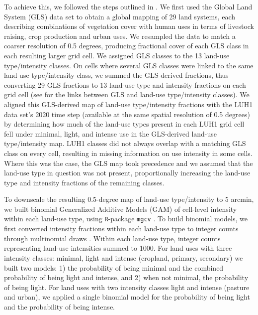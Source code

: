 \documentclass[titlesmallcaps,copyrightpage]{uomthesis}\usepackage[]{graphicx}\usepackage[]{color}
\begin{document}
To achieve this, we followed the steps outlined in \citet{newbold_global_2015}. We first used the Global Land System (GLS) data set \citep{van_asselen_land_2012} to obtain a global mapping of 29 land systems, each describing combinations of vegetation cover with human uses in terms of livestock raising, crop production and urban uses. We resampled the data to match a coarser resolution of 0.5 degrees, producing fractional cover of each GLS class in each resulting larger grid cell. We assigned GLS classes to the 13 land-use type/intensity classes. On cells where several GLS classes were linked to the same land-use type/intensity class, we summed the GLS-derived fractions, thus converting 29 GLS fractions to 13 land-use type and intensity fractions on each grid cell (see  for the links between GLS and land-use type/intensity classes). We aligned this GLS-derived map of land-use type/intensity fractions with the LUH1 data set's 2020 time step (available at the same spatial resolution of 0.5 degrees) by determining how much of the land-use types present in each LUH1 grid cell fell under minimal, light, and intense use in the GLS-derived land-use type/intensity map. LUH1 classes did not always overlap with a matching GLS class on every cell, resulting in missing information on use intensity in some cells. Where this was the case, the GLS map took precedence and we assumed that the land-use type in question was not present, proportionally increasing the land-use type and intensity fractions of the remaining classes.

To downscale the resulting 0.5-degree map of land-use type/intensity to 5 arcmin, we built binomial Generalized Additive Models (GAM) of cell-level intensity within each land-use type, using \texttt{R}-package \texttt{mgcv} \citep{r_development_core_team_r_2008, wood_fast_2011}. To build binomial models, we first converted intensity fractions within each land-use type to integer counts through multinomial draws \citep[see ,][]{kapitza_predictive_2020}. Within each land-use type, integer counts representing land-use intensities summed to 1000. For land uses with three intensity classes: minimal, light and intense (cropland, primary, secondary) we built two models: 1) the probability of being minimal and the combined probability of being light and intense, and 2) when not minimal, the probability of being light. For land uses with two intensity classes light and intense (pasture and urban), we applied a single binomial model for the probability of being light and the probability of being intense.
\end{document}

